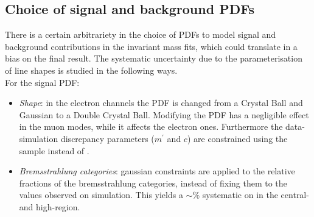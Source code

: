 \begin{table}[t!]
\begin{center}
\end{center}
\end{table}


\subsection{Choice of signal and background PDFs}

There is a certain arbitrariety in the choice of PDFs to model signal and background contributions in the
invariant mass fits, which could translate in a bias on the final result. The systematic uncertainty due to the
parameterisation of line shapes is studied in the following ways.
\\

For the signal PDF:
%
\begin{itemize}

\item \textit{Shape}: in the electron channels the PDF is changed from a Crystal Ball and Gaussian to a Double Crystal Ball.
Modifying the PDF has a negligible effect in the muon modes, while it affects the electron ones.
 Furthermore the data-simulation discrepancy parameters ($m^{'}$ and $c$) are constrained using the
\BdToKstGee sample instead of \BdToKstJPsee.

\item \textit{Bremsstrahlung categories}: gaussian constraints are applied to the relative fractions of the bremsstrahlung
categories, instead of fixing them to the values observed on simulation.
This yields a $\sim \%$ systematic on \RKst in the central- and high-\qsq region.


\end{itemize}

